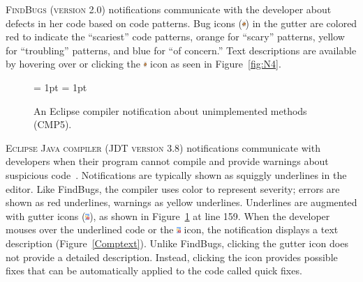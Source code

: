 \documentclass{llncs}
\begin{document}
\textsc{FindBugs (version 2.0)} notifications communicate with the developer about defects in her
code based on code patterns. Bug icons (\includegraphics[height=9px]{figs/bug}) in the gutter are colored red
to indicate the ``scariest'' code patterns, orange for ``scary'' patterns, yellow
for ``troubling'' patterns, and blue for ``of concern.'' Text descriptions are
available by hovering over or clicking the \includegraphics[height=9px]{figs/bug} icon as seen in Figure~\ref{fig:N4}.


\begin{figure} [h]
	\subfigcapskip = 1pt
	\centering
			\subfigcapskip = 1pt
					
					\caption{An Eclipse compiler notification about unimplemented methods (CMP5).}
					\label{fig:notificationCOMP} 
				\end{figure}

\textsc{Eclipse Java compiler (JDT version 3.8)} notifications communicate with developers when their program cannot
compile and provide warnings about suspicious code~\cite{EclipseCompiler}.
Notifications are typically shown as squiggly underlines in the editor. Like FindBugs, the compiler uses color to represent severity; errors
are shown as red underlines, warnings as yellow underlines.
Underlines are augmented with gutter icons
(\includegraphics[height=9px]{figs/comp-x}), as shown in
Figure~\ref{fig:notificationCOMP} at line 159. When the developer mouses over
the underlined code or the \includegraphics[height=9px]{figs/comp-x} icon, the
notification displays a text description (Figure~\ref{Comptext}). Unlike FindBugs, clicking the gutter icon does not provide a detailed description. Instead, clicking the icon provides possible fixes that can be automatically applied to the code called quick fixes.
\end{document}
